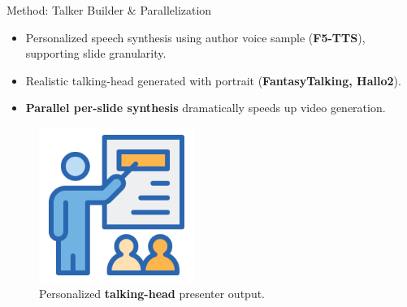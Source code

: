 \documentclass{beamer}
\newcommand{\alertterm}[1]{\alert{\textbf{#1}}}
\begin{document}
\begin{frame}{Method: Talker Builder \& Parallelization}
  \begin{itemize}
    \item Personalized speech synthesis using author voice sample (\alertterm{F5-TTS}), supporting slide granularity.
    \item Realistic talking-head generated with portrait (\alertterm{FantasyTalking, Hallo2}).
    \item \alertterm{Parallel per-slide synthesis} dramatically speeds up video generation.
  \end{itemize}
  \begin{figure}
    \includegraphics[width=0.45\textwidth]{figure/presenter.png}
    \caption{Personalized \alertterm{talking-head} presenter output.}
    \label{fig:presenter}
  \end{figure}
\end{frame}
\end{document}
